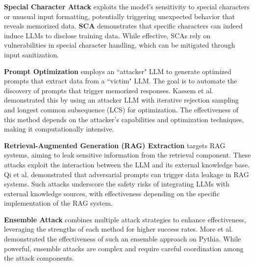 \textbf{Special Character Attack} exploits the model's sensitivity to special characters or unusual input formatting, potentially triggering unexpected behavior that reveals memorized data. \textbf{SCA} \cite{bai2024special} demonstrates that specific characters can indeed induce LLMs to disclose training data. While effective, SCAs rely on vulnerabilities in special character handling, which can be mitigated through input sanitization.

\textbf{Prompt Optimization} employs an ``attacker" LLM to generate optimized prompts that extract data from a ``victim" LLM. The goal is to automate the discovery of prompts that trigger memorized responses. Kassem et al. \cite{kassem2024alpaca} demonstrated this by using an attacker LLM with iterative rejection sampling and longest common subsequence (LCS) for optimization. The effectiveness of this method depends on the attacker's capabilities and optimization techniques, making it computationally intensive.

\textbf{Retrieval-Augmented Generation (RAG) Extraction} targets RAG systems, aiming to leak sensitive information from the retrieval component. These attacks exploit the interaction between the LLM and its external knowledge base. Qi et al. \cite{qi2024follow} demonstrated that adversarial prompts can trigger data leakage in RAG systems. Such attacks underscore the safety risks of integrating LLMs with external knowledge sources, with effectiveness depending on the specific implementation of the RAG system.

\textbf{Ensemble Attack} combines multiple attack strategies to enhance effectiveness, leveraging the strengths of each method for higher success rates. More et al. \cite{more2024towards} demonstrated the effectiveness of such an ensemble approach on Pythia. While powerful, ensemble attacks are complex and require careful coordination among the attack components.


